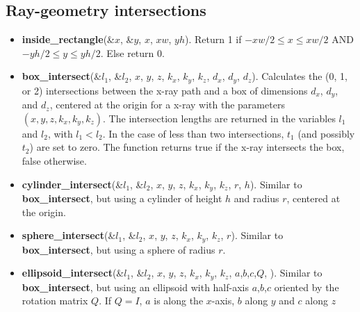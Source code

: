 \subsection{Ray-geometry intersections}
\begin{itemize}
\item {\bfseries inside\_rectangle}(\&$x$, \&$y$, $x$, $xw$, $yh$).
  Return 1 if $-xw/2 \leq x \leq xw/2$ AND $-yh/2 \leq y \leq yh/2$.
  Else return 0.
\item {\bfseries box\_intersect}(\&$l_1$, \&$l_2$, $x$, $y$, $z$, $k_x$, $k_y$, $k_z$,
  $d_x$, $d_y$, $d_z$). Calculates the (0, 1, or 2) intersections between
  the x-ray path and a box of dimensions $d_x$, $d_y$, and $d_z$,
  centered at the origin for a x-ray with the parameters
  $(x,y,z,k_x,k_y,k_z)$. The intersection lengths are returned
  in the variables $l_1$ and $l_2$, with $l_1 < l_2$. In the case
  of less than two intersections, $t_1$ (and possibly $t_2$) are set to
  zero. The function returns true if the x-ray intersects the box,
  false otherwise.
\item {\bfseries cylinder\_intersect}(\&$l_1$, \&$l_2$, $x$, $y$, $z$, $k_x$, $k_y$, $k_z$,
  $r$, $h$).  Similar to {\bfseries box\_intersect}, but using a cylinder of height $h$ and radius $r$,
  centered at the origin.
\item {\bfseries sphere\_intersect}(\&$l_1$, \&$l_2$, $x$, $y$, $z$, $k_x$, $k_y$, $k_z$,
  $r$). Similar to {\bfseries box\_intersect}, but using a sphere
  of radius $r$.
\item {\bfseries ellipsoid\_intersect}(\&$l_1$, \&$l_2$, $x$, $y$, $z$, $k_x$, $k_y$, $k_z$,
  $a$,$b$,$c$,$Q$, ). Similar to {\bfseries box\_intersect}, but using an ellipsoid with half-axis $a$,$b$,$c$ oriented by the rotation matrix $Q$.
  If $Q=I$, $a$ is along the $x$-axis, $b $ along $y$ and $c$ along $z$
\end{itemize}

